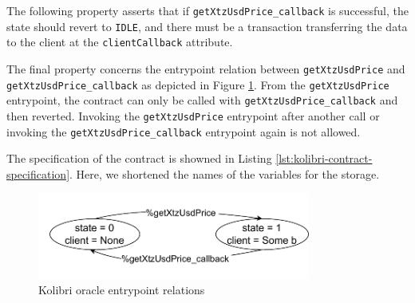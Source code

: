 \documentclass[a4paper,USenglish,cleveref, autoref,anonymous]{lipics-v2021}
\begin{document}
The following property asserts that if \lstinline/getXtzUsdPrice_callback/ is successful, the state should revert to \lstinline/IDLE/, and there must be a transaction transferring the data to the client at the \lstinline/clientCallback/ attribute. 

The final property concerns the entrypoint relation between
\lstinline/getXtzUsdPrice/ and \lstinline/getXtzUsdPrice_callback/ as
depicted in Figure \ref{fig:kolibri-oracle-emtrypoint-relations}. From
the \lstinline/getXtzUsdPrice/ entrypoint, the contract can only be
called with \lstinline/getXtzUsdPrice_callback/ and then
reverted. Invoking the \lstinline/getXtzUsdPrice/ entrypoint after
another call or invoking the \lstinline/getXtzUsdPrice_callback/
entrypoint again is not allowed. 

The specification of  the contract is showned in Listing \ref{lst:kolibri-contract-specification}. Here, we shortened the names of the variables for the storage.
\begin{figure}[tp]
    \centering
    \includegraphics[width=0.8\textwidth]{kolibri(1)}
    \caption{Kolibri oracle entrypoint relations}
    \label{fig:kolibri-oracle-emtrypoint-relations}
\end{figure}
\end{document}
